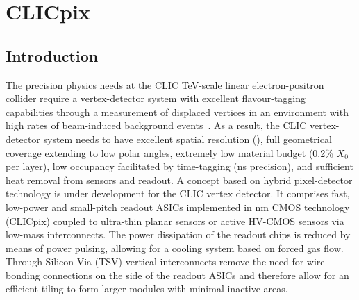 \section{CLICpix}

\subsection{Introduction}
 The precision physics needs at the CLIC TeV-scale linear electron-positron collider
require a vertex-detector system with excellent flavour-tagging capabilities through
a measurement of displaced vertices in an environment with high rates
of beam-induced background events~\cite{Miyamoto:1425915}.
As a result, the CLIC vertex-detector system needs to have excellent spatial resolution
(\unit[3]{\micron}),
full geometrical coverage extending to low polar angles, extremely low material budget
(0.2\% $X_0$ per layer),
low occupancy facilitated by time-tagging (\unit[10]{ns} precision), and sufficient heat
removal from sensors and readout.
A concept based on hybrid pixel-detector technology is under development
for the CLIC vertex detector. It comprises fast, low-power and small-pitch readout
ASICs implemented in \unit[65]{nm} CMOS technology (CLICpix) coupled to ultra-thin planar sensors
or active HV-CMOS sensors via low-mass interconnects. The power dissipation of the
readout chips is reduced by means of power pulsing, allowing for a cooling system
based on forced gas flow. Through-Silicon Via (TSV) vertical interconnects remove the need for wire
bonding connections on the side of the readout ASICs
and therefore allow for an efficient tiling to form larger modules with minimal
inactive areas.
